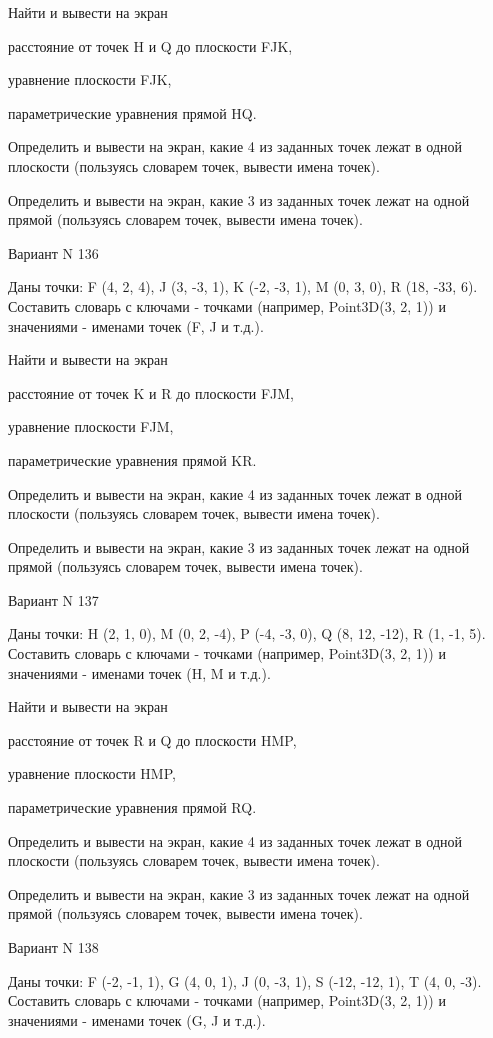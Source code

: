 \documentclass[11pt]{report}
\begin{document}
Найти и вывести на экран


расстояние от точек H и Q до плоскости FJK,


уравнение плоскости FJK,


параметрические уравнения прямой HQ.


Определить и вывести на экран, какие 4 из заданных точек лежат в одной плоскости (пользуясь словарем точек, вывести имена точек).


Определить и вывести на экран, какие 3 из заданных точек лежат на одной прямой (пользуясь словарем точек, вывести имена точек).

\newpage
Вариант N 136

Даны точки: F (4, 2, 4), J (3, -3, 1), K (-2, -3, 1), M (0, 3, 0), R (18, -33, 6).
Составить словарь с ключами - точками (например, Point3D(3, 2, 1)) и значениями - именами точек (F, J и т.д.).


Найти и вывести на экран


расстояние от точек K и R до плоскости FJM,


уравнение плоскости FJM,


параметрические уравнения прямой KR.


Определить и вывести на экран, какие 4 из заданных точек лежат в одной плоскости (пользуясь словарем точек, вывести имена точек).


Определить и вывести на экран, какие 3 из заданных точек лежат на одной прямой (пользуясь словарем точек, вывести имена точек).

\newpage
Вариант N 137

Даны точки: H (2, 1, 0), M (0, 2, -4), P (-4, -3, 0), Q (8, 12, -12), R (1, -1, 5).
Составить словарь с ключами - точками (например, Point3D(3, 2, 1)) и значениями - именами точек (H, M и т.д.).


Найти и вывести на экран


расстояние от точек R и Q до плоскости HMP,


уравнение плоскости HMP,


параметрические уравнения прямой RQ.


Определить и вывести на экран, какие 4 из заданных точек лежат в одной плоскости (пользуясь словарем точек, вывести имена точек).


Определить и вывести на экран, какие 3 из заданных точек лежат на одной прямой (пользуясь словарем точек, вывести имена точек).

\newpage
Вариант N 138

Даны точки: F (-2, -1, 1), G (4, 0, 1), J (0, -3, 1), S (-12, -12, 1), T (4, 0, -3).
Составить словарь с ключами - точками (например, Point3D(3, 2, 1)) и значениями - именами точек (G, J и т.д.).
\end{document}
